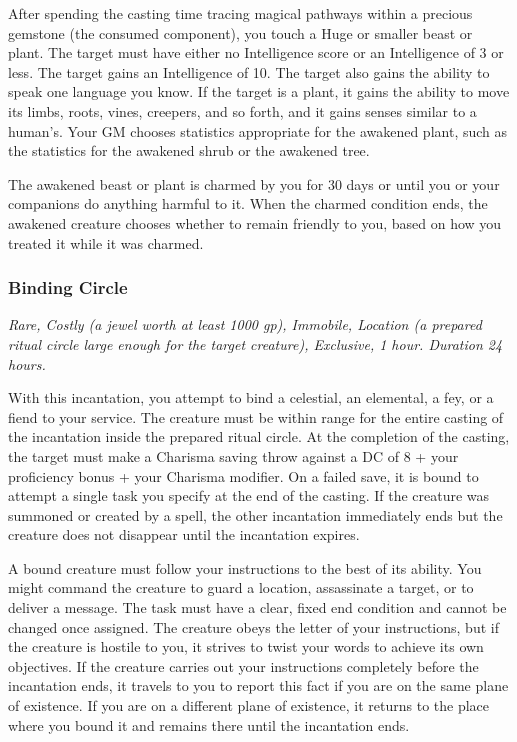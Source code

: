 After spending the casting time tracing magical pathways within a precious gemstone (the consumed component), you touch a Huge or smaller beast or plant. The target must have either no Intelligence score or an Intelligence of 3 or less. The target gains an Intelligence of 10. The target also gains the ability to speak one language you know. If the target is a plant, it gains the ability to move its limbs, roots, vines, creepers, and so forth, and it gains senses similar to a human's. Your GM chooses statistics appropriate for the awakened plant, such as the statistics for the awakened shrub or the awakened tree.

The awakened beast or plant is charmed by you for 30 days or until you or your companions do anything harmful to it. When the charmed condition ends, the awakened creature chooses whether to remain friendly to you, based on how you treated it while it was charmed.

\subsubsection{Binding Circle}
\textit{Rare, Costly (a jewel worth at least 1000 gp), Immobile, Location (a prepared ritual circle large enough for the target creature), Exclusive, 1 hour. Duration 24 hours.}

With this incantation, you attempt to bind a celestial, an elemental, a fey, or a fiend to your service. The creature must be within range for the entire casting of the incantation inside the prepared ritual circle. At the completion of the casting, the target must make a Charisma saving throw against a DC of 8 + your proficiency bonus + your Charisma modifier. On a failed save, it is bound to attempt a single task you specify at the end of the casting. If the creature was summoned or created by a spell, the other incantation immediately ends but the creature does not disappear until the incantation expires.

A bound creature must follow your instructions to the best of its ability. You might command the creature to guard a location, assassinate a target, or to deliver a message. The task must have a clear, fixed end condition and cannot be changed once assigned. The creature obeys the letter of your instructions, but if the creature is hostile to you, it strives to twist your words to achieve its own objectives. If the creature carries out your instructions completely before the incantation ends, it travels to you to report this fact if you are on the same plane of existence. If you are on a different plane of existence, it returns to the place where you bound it and remains there until the incantation ends.

